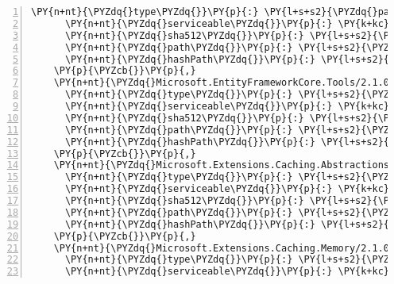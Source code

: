 \begin{Verbatim}[commandchars=\\\{\},numbers=left,firstnumber=1,stepnumber=1,numberblanklines=0]
      \PY{n+nt}{\PYZdq{}type\PYZdq{}}\PY{p}{:} \PY{l+s+s2}{\PYZdq{}package\PYZdq{}}\PY{p}{,}
      \PY{n+nt}{\PYZdq{}serviceable\PYZdq{}}\PY{p}{:} \PY{k+kc}{true}\PY{p}{,}
      \PY{n+nt}{\PYZdq{}sha512\PYZdq{}}\PY{p}{:} \PY{l+s+s2}{\PYZdq{}sha512\PYZhy{}04V0VrEO7wUWS9Y5xqAKPs7kUI1OKMPRIhvEF9B5W7ZhFlk3H7vqiVDa7bUWkuZq12umicD++aDNCqEytwagDA==\PYZdq{}}\PY{p}{,}
      \PY{n+nt}{\PYZdq{}path\PYZdq{}}\PY{p}{:} \PY{l+s+s2}{\PYZdq{}microsoft.entityframeworkcore.sqlserver/2.1.0\PYZhy{}rc1\PYZhy{}final\PYZdq{}}\PY{p}{,}
      \PY{n+nt}{\PYZdq{}hashPath\PYZdq{}}\PY{p}{:} \PY{l+s+s2}{\PYZdq{}microsoft.entityframeworkcore.sqlserver.2.1.0\PYZhy{}rc1\PYZhy{}final.nupkg.sha512\PYZdq{}}
    \PY{p}{\PYZcb{}}\PY{p}{,}
    \PY{n+nt}{\PYZdq{}Microsoft.EntityFrameworkCore.Tools/2.1.0\PYZhy{}rc1\PYZhy{}final\PYZdq{}}\PY{p}{:} \PY{p}{\PYZob{}}
      \PY{n+nt}{\PYZdq{}type\PYZdq{}}\PY{p}{:} \PY{l+s+s2}{\PYZdq{}package\PYZdq{}}\PY{p}{,}
      \PY{n+nt}{\PYZdq{}serviceable\PYZdq{}}\PY{p}{:} \PY{k+kc}{true}\PY{p}{,}
      \PY{n+nt}{\PYZdq{}sha512\PYZdq{}}\PY{p}{:} \PY{l+s+s2}{\PYZdq{}sha512\PYZhy{}iDbBVZpsM/mzA8c6O09D2qCWnqpN0SvpSLneyzM+DWMKdXEq8vtyVuXhJUlznDScWoKcDkQ7wTDxgyUolvRUrQ==\PYZdq{}}\PY{p}{,}
      \PY{n+nt}{\PYZdq{}path\PYZdq{}}\PY{p}{:} \PY{l+s+s2}{\PYZdq{}microsoft.entityframeworkcore.tools/2.1.0\PYZhy{}rc1\PYZhy{}final\PYZdq{}}\PY{p}{,}
      \PY{n+nt}{\PYZdq{}hashPath\PYZdq{}}\PY{p}{:} \PY{l+s+s2}{\PYZdq{}microsoft.entityframeworkcore.tools.2.1.0\PYZhy{}rc1\PYZhy{}final.nupkg.sha512\PYZdq{}}
    \PY{p}{\PYZcb{}}\PY{p}{,}
    \PY{n+nt}{\PYZdq{}Microsoft.Extensions.Caching.Abstractions/2.1.0\PYZhy{}rc1\PYZhy{}final\PYZdq{}}\PY{p}{:} \PY{p}{\PYZob{}}
      \PY{n+nt}{\PYZdq{}type\PYZdq{}}\PY{p}{:} \PY{l+s+s2}{\PYZdq{}package\PYZdq{}}\PY{p}{,}
      \PY{n+nt}{\PYZdq{}serviceable\PYZdq{}}\PY{p}{:} \PY{k+kc}{true}\PY{p}{,}
      \PY{n+nt}{\PYZdq{}sha512\PYZdq{}}\PY{p}{:} \PY{l+s+s2}{\PYZdq{}sha512\PYZhy{}G2hoy78wNvlwDuoHZOZT9m+JygxeXtRemKhw9lC1STaYqN0i52QAgXTK/ejKy/+iPwjZ8l3yvAn+MnC8DN+A5w==\PYZdq{}}\PY{p}{,}
      \PY{n+nt}{\PYZdq{}path\PYZdq{}}\PY{p}{:} \PY{l+s+s2}{\PYZdq{}microsoft.extensions.caching.abstractions/2.1.0\PYZhy{}rc1\PYZhy{}final\PYZdq{}}\PY{p}{,}
      \PY{n+nt}{\PYZdq{}hashPath\PYZdq{}}\PY{p}{:} \PY{l+s+s2}{\PYZdq{}microsoft.extensions.caching.abstractions.2.1.0\PYZhy{}rc1\PYZhy{}final.nupkg.sha512\PYZdq{}}
    \PY{p}{\PYZcb{}}\PY{p}{,}
    \PY{n+nt}{\PYZdq{}Microsoft.Extensions.Caching.Memory/2.1.0\PYZhy{}rc1\PYZhy{}final\PYZdq{}}\PY{p}{:} \PY{p}{\PYZob{}}
      \PY{n+nt}{\PYZdq{}type\PYZdq{}}\PY{p}{:} \PY{l+s+s2}{\PYZdq{}package\PYZdq{}}\PY{p}{,}
      \PY{n+nt}{\PYZdq{}serviceable\PYZdq{}}\PY{p}{:} \PY{k+kc}{true}\PY{p}{,}

\end{Verbatim}
